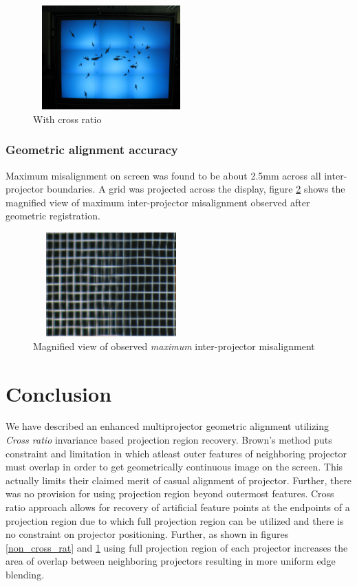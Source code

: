 \documentclass[conference]{/home/pranav/Desktop/Publication_work/latex_class_files/IEEEtran}
\begin{document}
\begin{figure}
\centering
\includegraphics[width=6cm,height=4cm]{figures/with_cross_rat.jpg}
\caption{With cross ratio}
\label{cross_rat}
\end{figure}

\subsubsection{Geometric alignment accuracy}
Maximum misalignment on screen was found to be about 2.5mm across all inter-projector boundaries. A grid was projected across the display, figure \ref{misalign} shows the magnified view of maximum inter-projector misalignment observed after geometric registration.

\begin{figure}
\centering
\includegraphics[width=6cm,height=4cm]{figures/misalign_1.png}
\caption{Magnified view of observed \textit{maximum} inter-projector misalignment}
\label{misalign}
\end{figure}


\section{Conclusion}
We have described an enhanced multiprojector geometric alignment utilizing \textit{Cross ratio} invariance based projection region recovery. Brown's method puts constraint and limitation in which atleast outer features of neighboring projector must overlap in order to get geometrically continuous image on the screen. This actually limits their claimed merit of casual alignment of projector. Further, there was no provision for using projection region beyond outermost features. Cross ratio approach allows for recovery of artificial feature points at the endpoints of a projection region due to which full projection region can be utilized and there is no constraint on projector positioning. Further, as shown in figures \ref{non_cross_rat} and \ref{cross_rat} using full projection region of each projector increases the area of overlap between neighboring projectors resulting in more uniform edge blending.
\end{document}
